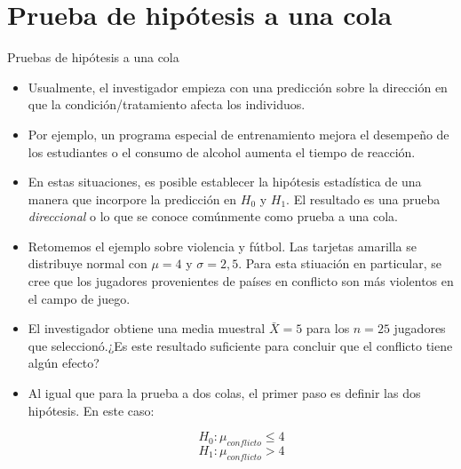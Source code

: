 \documentclass{beamer}
\begin{document}
\section{Prueba de hipótesis a una cola}
\begin{frame}{Pruebas de hipótesis a una cola}
\begin{itemize}
\justifying
\item Usualmente, el investigador empieza con una predicción sobre la dirección en que la condición/tratamiento afecta los individuos.
\item Por ejemplo, un programa especial de entrenamiento mejora el desempeño de los estudiantes o el consumo de alcohol aumenta el tiempo de reacción.
\item En estas situaciones, es posible establecer la hipótesis estadística de una manera que incorpore la predicción en $H_0$ y $H_1$. El resultado es una prueba \emph{direccional} o lo que se conoce comúnmente como prueba a una cola.

\end{itemize}
\end{frame}

\begin{frame}
\begin{itemize}
\justifying
\item Retomemos el ejemplo sobre violencia y fútbol. Las tarjetas amarilla se distribuye normal con $\mu=4$ y $\sigma=2,5$. Para esta stiuación en particular, se cree que los jugadores provenientes de países en conflicto son más violentos en el campo de juego.
\item El investigador obtiene una media muestral $\bar{X}=5$ para los $n=25$ jugadores que seleccionó.¿Es este resultado suficiente para concluir que el conflicto tiene algún efecto?
\item Al igual que para la prueba a dos colas, el primer paso es definir las dos hipótesis. En este caso:

$$H_0: \mu_{conflicto}\leq 4$$ 
$$H_1: \mu_{conflicto}>4$$

\end{itemize}
\end{frame}
\end{document}
